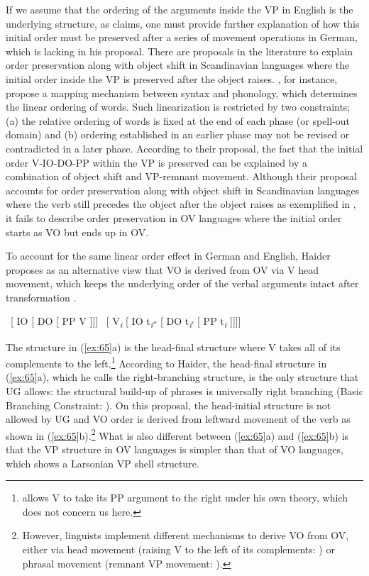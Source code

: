 If we assume that the ordering of the arguments inside the \ac{VP} in English is the underlying structure, as \citet{Kayne1994} claims, one must provide further explanation of how this initial order must be preserved after a series of movement operations in German, which is lacking in his proposal. There are proposals in the literature to explain order preservation along with object shift in Scandinavian languages where the initial order inside the \ac{VP} is preserved after the object raises. \citet{FoxPesetsky2005}, for instance, propose a mapping mechanism between syntax and phonology, which determines the linear ordering of words. Such linearization is restricted by two constraints; (a) the relative ordering of words is fixed at the end of each phase (or spell-out domain) and (b) ordering established in an earlier phase may not be revised or contradicted in a later phase. According to their proposal, the fact that the initial order V-\ac{IO}-\ac{DO}-\ac{PP} within the \ac{VP} is preserved can be explained by a combination of object shift and \ac{VP}-remnant movement. Although their proposal accounts for order preservation along with object shift in Scandinavian languages where the verb still precedes the object after the object raises as exemplified in , it fails to describe order preservation in \ac{OV} languages where the initial order starts as \ac{VO} but ends up in \ac{OV}.

To account for the same linear order effect in German and English, Haider proposes as an alternative view that \ac{VO} is derived from \ac{OV} via V head movement, which keeps the underlying order of the verbal arguments intact after transformation . 

\ea\label{ex:65}
    \ea  ~[ IO [ DO [ PP V ]]]
    \ex ~[ V\textit{\textsubscript{i}} [ IO t\textit{\textsubscript{i$''$}} [ DO t\textit{\textsubscript{i$'$}} [ PP t\textit{\textsubscript{i}} ]]]]
    \z
\z

The structure in (\ref{ex:65}a) is the head-final structure where V takes all of its complements to the left.\footnote{\citet{Haider1992} allows V to take its \ac{PP} argument to the right under his own theory, which does not concern us here.} According to Haider, the head-final structure in (\ref{ex:65}a), which he calls the right-branching structure, is the only structure that \ac{UG} allows: the structural build-up of phrases is universally right branching (Basic Branching Constraint: \citealt{Haider1992,Haider2000}). On this proposal, the head-initial structure is not allowed by \ac{UG} and \ac{VO} order is derived from leftward movement of the verb as shown in (\ref{ex:65}b).\footnote{However, linguists implement different mechanisms to derive \ac{VO} from \ac{OV}, either via head movement (raising V to the left of its complements: \citealt{Barbiers2000,Haider1992,Haider2000}) or phrasal movement (remnant \ac{VP} movement: \citealt{Taraldsen2000}).} What is also different between (\ref{ex:65}a) and (\ref{ex:65}b) is that the \ac{VP} structure in \ac{OV} languages is simpler than that of \ac{VO} languages, which shows a Larsonian \ac{VP} shell structure.  

